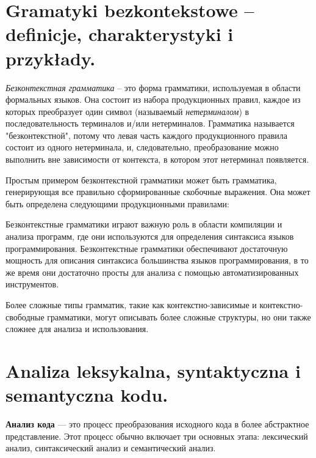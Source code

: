 \section{Gramatyki bezkontekstowe – definicje, charakterystyki i przykłady.}

\textit{Безконтекстная грамматика} – это форма грамматики, используемая в области формальных языков. Она состоит из набора продукционных правил, каждое из которых преобразует один символ (называемый \textit{нетерминалом}) в последовательность терминалов и/или нетерминалов. Грамматика называется "безконтекстной", потому что левая часть каждого продукционного правила состоит из одного нетерминала, и, следовательно, преобразование можно выполнить вне зависимости от контекста, в котором этот нетерминал появляется.

Простым примером безконтекстной грамматики может быть грамматика, генерирующая все правильно сформированные скобочные выражения. Она может быть определена следующими продукционными правилами:

Безконтекстные грамматики играют важную роль в области компиляции и анализа программ, где они используются для определения синтаксиса языков программирования. Безконтекстные грамматики обеспечивают достаточную мощность для описания синтаксиса большинства языков программирования, в то же время они достаточно просты для анализа с помощью автоматизированных инструментов.

Более сложные типы грамматик, такие как контекстно-зависимые и контекстно-свободные грамматики, могут описывать более сложные структуры, но они также сложнее для анализа и использования.

\section{Analiza leksykalna, syntaktyczna i semantyczna kodu. }

\textbf{Анализ кода} — это процесс преобразования исходного кода в более абстрактное представление. Этот процесс обычно включает три основных этапа: лексический анализ, синтаксический анализ и семантический анализ.


